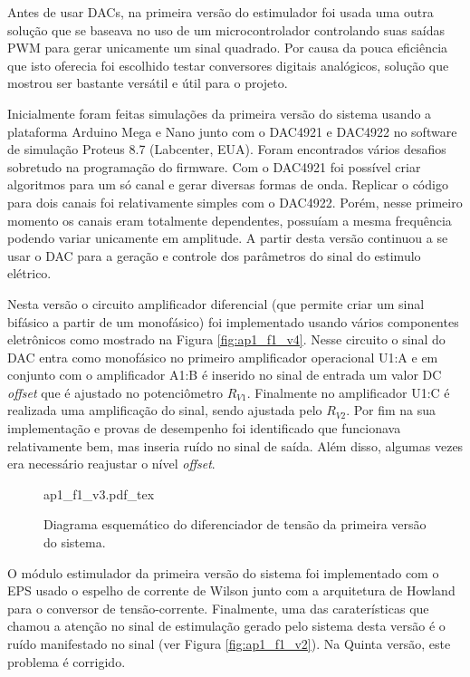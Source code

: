Antes de usar \acrshort{DAC}s, na primeira versão do estimulador foi usada uma outra solução que se baseava no uso de um microcontrolador controlando suas saídas \acrshort{PWM} para gerar unicamente um sinal quadrado. Por causa da pouca eficiência que isto oferecia foi escolhido testar conversores digitais analógicos, solução que mostrou ser bastante versátil e útil para o projeto. 

Inicialmente foram feitas simulações da primeira versão do sistema usando a plataforma Arduino Mega e Nano junto com o DAC4921 e DAC4922 no software de simulação Proteus 8.7 (Labcenter, EUA). Foram encontrados vários desafios sobretudo na programação do firmware. Com o DAC4921 foi possível criar algoritmos para um só canal e gerar diversas formas de onda. Replicar o código para dois canais foi relativamente simples com o DAC4922. Porém, nesse primeiro momento os canais eram totalmente dependentes, possuíam a mesma frequência podendo variar unicamente em amplitude. A partir desta versão continuou a se usar o \acrshort{DAC} para a geração e controle dos parâmetros do sinal do estimulo elétrico. 

Nesta versão o circuito amplificador diferencial (que permite criar um sinal bifásico a partir de um monofásico) foi implementado usando vários componentes eletrônicos como mostrado na Figura \ref{fig:ap1_f1_v4}. Nesse circuito o sinal do \acrshort{DAC} entra como monofásico no primeiro amplificador operacional U1:A e em conjunto com o amplificador A1:B é inserido no sinal de entrada um valor DC \textit{offset} que é ajustado no potenciômetro $R_{V1}$. Finalmente no amplificador U1:C é realizada uma amplificação do sinal, sendo ajustada pelo $R_{V2}$. Por fim na sua implementação e provas de desempenho foi identificado que funcionava relativamente bem, mas inseria ruído no sinal de saída. Além disso, algumas vezes era necessário reajustar o nível \textit{offset}.

\begin{figure*}[h]
    \centering %
    \small %
    \def\svgwidth{0.7\columnwidth}%
    {ap1_f1_v3.pdf_tex}
    \caption{Diagrama esquemático do diferenciador de tensão da primeira versão do sistema.}
    \label{fig:ap1_f1_v3}
\end{figure*}

O módulo estimulador da primeira versão do sistema foi implementado com o EPS usado o espelho de corrente de Wilson junto com a arquitetura de Howland para o conversor de tensão-corrente. Finalmente, uma das caraterísticas que chamou a atenção no sinal de estimulação gerado pelo sistema desta versão é o ruído manifestado no sinal (ver Figura \ref{fig:ap1_f1_v2}). Na Quinta versão, este problema é corrigido.


